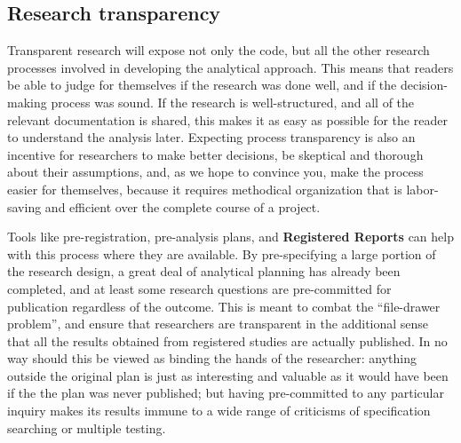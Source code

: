 \subsection{Research transparency}

Transparent research will expose not only the code,
but all the other research processes involved in developing the analytical approach.
This means that readers be able to judge for themselves if the research was done well,
and if the decision-making process was sound.
If the research is well-structured, and all of the relevant documentation is shared,
this makes it as easy as possible for the reader to understand the analysis later.
Expecting process transparency is also an incentive for researchers to make better decisions,
be skeptical and thorough about their assumptions,
and, as we hope to convince you, make the process easier for themselves,
because it requires methodical organization that is labor-saving and efficient over the complete course of a project.

Tools like pre-registration, pre-analysis plans, and
\textbf{Registered Reports}
can help with this process where they are available.
By pre-specifying a large portion of the research design,
a great deal of analytical planning has already been completed,
and at least some research questions are pre-committed for publication regardless of the outcome.
This is meant to combat the ``file-drawer problem'',\cite{simonsohn2014p}
and ensure that researchers are transparent in the additional sense that
all the results obtained from registered studies are actually published.
In no way should this be viewed as binding the hands of the researcher:
anything outside the original plan is just as interesting and valuable
as it would have been if the the plan was never published;
but having pre-committed to any particular inquiry makes its results
immune to a wide range of criticisms of specification searching or multiple testing.

